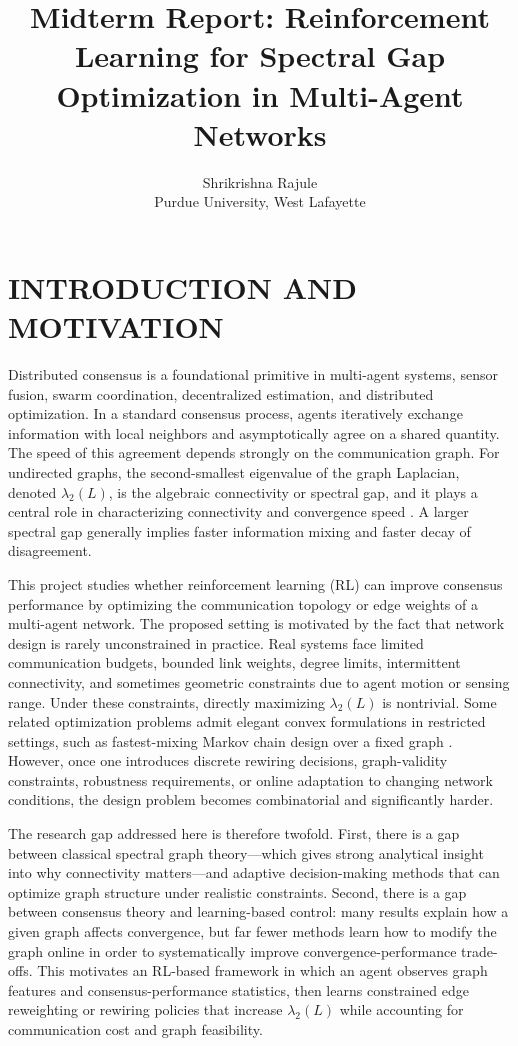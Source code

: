 \documentclass[letterpaper, 11 pt, journal, twoside]{IEEEtran}
\title{Midterm Report: Reinforcement Learning for Spectral Gap Optimization in Multi-Agent Networks}
\author{Shrikrishna Rajule\\
Purdue University, West Lafayette}
\begin{document}
\maketitle

\section{INTRODUCTION AND MOTIVATION}
Distributed consensus is a foundational primitive in multi-agent systems, sensor fusion, swarm coordination, decentralized estimation, and distributed optimization. In a standard consensus process, agents iteratively exchange information with local neighbors and asymptotically agree on a shared quantity. The speed of this agreement depends strongly on the communication graph. For undirected graphs, the second-smallest eigenvalue of the graph Laplacian, denoted $\lambda_2(L)$, is the algebraic connectivity or spectral gap, and it plays a central role in characterizing connectivity and convergence speed \cite{Fiedler1973,OlfatiSaber2007,RenBeard2005}. A larger spectral gap generally implies faster information mixing and faster decay of disagreement.

This project studies whether reinforcement learning (RL) can improve consensus performance by optimizing the communication topology or edge weights of a multi-agent network. The proposed setting is motivated by the fact that network design is rarely unconstrained in practice. Real systems face limited communication budgets, bounded link weights, degree limits, intermittent connectivity, and sometimes geometric constraints due to agent motion or sensing range. Under these constraints, directly maximizing $\lambda_2(L)$ is nontrivial. Some related optimization problems admit elegant convex formulations in restricted settings, such as fastest-mixing Markov chain design over a fixed graph \cite{Boyd2004}. However, once one introduces discrete rewiring decisions, graph-validity constraints, robustness requirements, or online adaptation to changing network conditions, the design problem becomes combinatorial and significantly harder.

The research gap addressed here is therefore twofold. First, there is a gap between classical spectral graph theory---which gives strong analytical insight into why connectivity matters---and adaptive decision-making methods that can optimize graph structure under realistic constraints. Second, there is a gap between consensus theory and learning-based control: many results explain how a given graph affects convergence, but far fewer methods learn how to modify the graph online in order to systematically improve convergence-performance trade-offs. This motivates an RL-based framework in which an agent observes graph features and consensus-performance statistics, then learns constrained edge reweighting or rewiring policies that increase $\lambda_2(L)$ while accounting for communication cost and graph feasibility.
\end{document}

